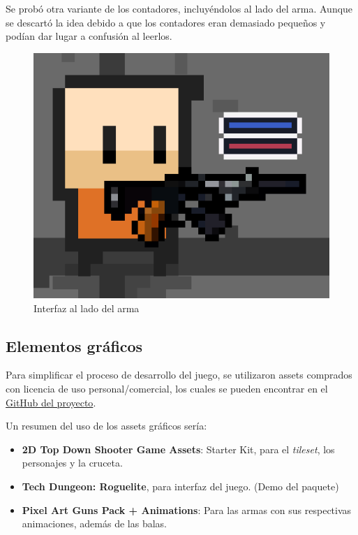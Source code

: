 \documentclass[12pt]{article}
\begin{document}
        Se probó otra variante de los contadores, incluyéndolos al lado del arma. Aunque se descartó la idea debido a que los contadores eran demasiado pequeños y podían dar lugar a confusión al leerlos.
        
        \begin{figure}[H]
            \centering
            \includegraphics[scale = 0.5]{Images/UI descartada.png}
            \caption{Interfaz al lado del arma}
            \label{fig:UI descartada}
        \end{figure}
        
    \subsection{Elementos gráficos}
        
        Para simplificar el proceso de desarrollo del juego, se utilizaron assets comprados con licencia de uso personal/comercial, los cuales se pueden encontrar en el \href{https://github.com/JesusJMUJI/TopDownShooterGame}{GitHub del proyecto}.
        
        Un resumen del uso de los assets gráficos sería:
        \begin{itemize}
            \item \textbf{2D Top Down Shooter Game Assets}: Starter Kit, para el \textit{tileset}, los personajes y la cruceta.
            \item \textbf{Tech Dungeon: Roguelite}, para interfaz del juego. (Demo del paquete)
            \item \textbf{Pixel Art Guns Pack + Animations}: Para las armas con sus respectivas animaciones, además de las balas.
        \end{itemize}
        
\end{document}
